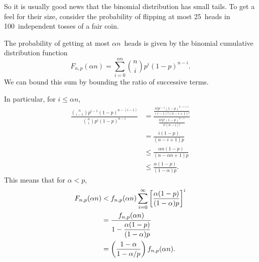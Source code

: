 \begin{editingnotes}
So it is usually good news that the binomial distribution has small
tails.  To get a feel for their size, consider the probability of
flipping at most 25~heads in 100~independent tosses of a fair coin.

The probability of getting at most $\alpha n$~heads is given by
the binomial cumulative distribution function
\begin{equation}\label{LN12:Jsum}
F_{n, p}(\alpha n)
    = \sum_{i = 0}^{\alpha n} \binom{n}{i} p^i (1 - p)^{n - i}.
\end{equation}
We can bound this sum by bounding the ratio of successive terms.

In particular, for $i \le \alpha n$,
\begingroup
{}
\begin{align*}
\frac{ \displaystyle \binom{n}{i - 1} p^{i - 1} (1 - p)^{n - (i - 1)} }
     { \displaystyle \binom{n}{i}     p^i       (1 - p)^{n - i} }
    &=    \frac{\displaystyle
                  \frac{ n! p^{i - 1} (1 - p)^{n - i + 1} }
                       { (i - 1)! (n - i + 1) ! }
              }
              {\displaystyle
                  \frac{ n! p^i (1 - p)^{n - i} }
                       { i! (n - i)! }
              } \\
    &=    \frac{ i (1 - p) }{ (n - i + 1) p } \\
    &\le  \frac{ \alpha n (1 - p) }{ (n - \alpha n + 1) p } \\
    &\le  \frac{ \alpha (1 - p) }{ (1 - \alpha) p }.
\end{align*}
\endgroup
This means that for $\alpha < p$,
\begingroup
{}
\begin{align}
F_{n, p}(\alpha n)
    &<  f_{n, p}(\alpha n)
        \sum_{i = 0}^\infty \left[ \frac{\alpha(1 - p)}{(1 - \alpha)p}\right]^i
\notag \\
    &= \frac{\displaystyle f_{n, p}(\alpha n)}
            {\displaystyle 1 - \frac{\alpha (1 - p)}{(1 - \alpha)p}}
            \notag\\
    &= \left( \frac{1 - \alpha}{1 - \alpha/p} \right) f_{n, p}(\alpha n).
\label{eqn:16F7}
\end{align}
\endgroup


\end{editingnotes}
